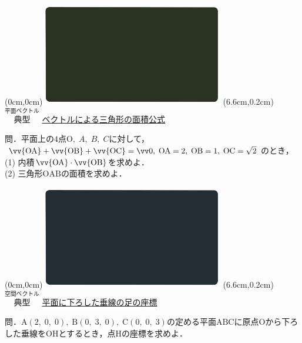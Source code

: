 \documentclass[10pt,
fleqn,
dvipdfmx,
uplatex
]{jsarticle}
\begin{document}
\newpage



\at(0cm,0cm){\includegraphics[width=8cm,bb=0 0 1920 1080]{./youtube/thumbnails/templates/smart_background/平面ベクトル.jpeg}}
\at(6.6cm,0.2cm){\small\color{bradorange}$\overset{\text{平面ベクトル}}{\text{典型}}$}
{\color{orange}\large\underline{ベクトルによる三角形の面積公式}}\vspace{0.3zw}

\large 
問．平面上の$4$点$\text{O},\;A,\;B,\;C$に対して，$\vv {\text{OA}}+\vv {\text{OB}}+\vv {\text{OC}}=\vv 0,\;\text{OA}=2,\;\text{OB}=1,\;\text{OC}=\sqrt 2$のとき，\\
(1)  内積$\vv {\text{OA}}\cdot \vv {\text{OB}}$を求めよ．\\
(2)  三角形$\text{OAB}$の面積を求めよ．\\



\newpage



\at(0cm,0cm){\includegraphics[width=8cm,bb=0 0 1920 1080]{./youtube/thumbnails/templates/smart_background/空間ベクトル.jpeg}}
\at(6.6cm,0.2cm){\small\color{bradorange}$\overset{\text{空間ベクトル}}{\text{典型}}$}
{\color{orange}\Large\underline{平面に下ろした垂線の足の座標}}\vspace{0.3zw}

\Large 
問．$\text{A}\left(2,\;0,\;0\right),\;\text{B}\left(0,\;3,\;0\right),\;\text{C}\left(0,\;0,\;3\right)$の定める平面$\text{ABC}$に原点$\text{O}$から下ろした垂線を$\text{OH}$とするとき，点$\text{H}$の座標を求めよ．


\newpage
\end{document}
